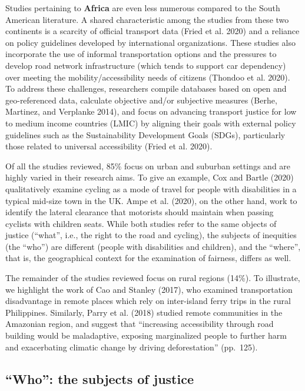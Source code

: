 \documentclass[12pt, oneside]{report}
\begin{document}
Studies pertaining to \textbf{Africa} are even less numerous compared to
the South American literature. A shared characteristic among the studies
from these two continents is a scarcity of official transport data
(Fried et al. 2020) and a reliance on policy guidelines developed by
international organizations. These studies also incorporate the use of
informal transportation options and the pressures to develop road
network infrastructure (which tends to support car dependency) over
meeting the mobility/accessibility needs of citizens (Thondoo et al.
2020). To address these challenges, researchers compile databases based
on open and geo-referenced data, calculate objective and/or subjective
measures (Berhe, Martinez, and Verplanke 2014), and focus on advancing
transport justice for low to medium income countries (LMIC) by aligning
their goals with external policy guidelines such as the Sustainability
Development Goals (SDGs), particularly those related to universal
accessibility (Fried et al. 2020).

Of all the studies reviewed, 85\% focus on urban and suburban settings
and are highly varied in their research aims. To give an example, Cox
and Bartle (2020) qualitatively examine cycling as a mode of travel for
people with disabilities in a typical mid-size town in the UK. Ampe et
al. (2020), on the other hand, work to identify the lateral clearance
that motorists should maintain when passing cyclists with children
seats. While both studies refer to the same objects of justice
(``what'', i.e., the right to the road and cycling), the subjects of
inequities (the ``who'') are different (people with disabilities and
children), and the ``where'', that is, the geographical context for the
examination of fairness, differs as well.

The remainder of the studies reviewed focus on rural regions (14\%). To
illustrate, we highlight the work of Cao and Stanley (2017), who
examined transportation disadvantage in remote places which rely on
inter-island ferry trips in the rural Philippines. Similarly, Parry et
al. (2018) studied remote communities in the Amazonian region, and
suggest that ``increasing accessibility through road building would be
maladaptive, exposing marginalized people to further harm and
exacerbating climatic change by driving deforestation'' (pp.~125).

\hypertarget{who-the-subjects-of-justice}{%
\subsection{``Who'': the subjects of
justice}\label{who-the-subjects-of-justice}}
\end{document}
